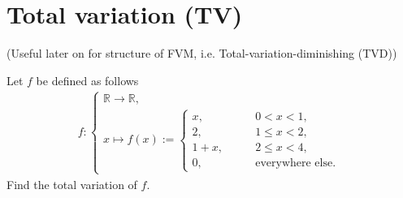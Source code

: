 \documentclass[12pt]{article}
\begin{document}
\section{Total variation (TV)}
(Useful later on for structure of FVM, i.e. Total-variation-diminishing (TVD))
\begin{example}
	Let $f$ be defined as follows
	\begin{align}
		f:
		\begin{cases}
			\mathbb{R} \rightarrow \mathbb{R}, \\
			x \mapsto
			f(x) := 
			\begin{cases}
				x, \quad   & \quad  0<x<1,                 \\
				2, \quad   & \quad  1\leq x < 2,           \\
				1+x, \quad & \quad  2\leq x < 4,           \\
				0, \quad   & \quad \text{everywhere else}.
			\end{cases}
		\end{cases}
	\end{align}
	Find the total variation of $f$.
	
\end{example}
\end{document}
